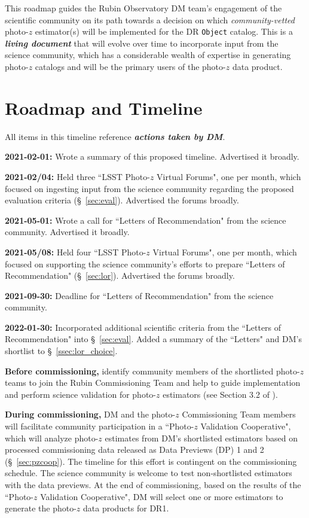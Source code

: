 \documentclass[DM,authoryear,toc]{lsstdoc}
\begin{document}
This roadmap guides the Rubin Observatory DM team's engagement of the scientific community on its path towards a decision on which \textit{community-vetted} photo-$z$ estimator(s) will be implemented for the DR {\tt Object} catalog.
This is a \textit{\textbf{living document}} that will evolve over time to incorporate input from the science community, which has a considerable wealth of expertise in generating photo-$z$ catalogs and will be the primary users of the photo-$z$ data product.


\section{Roadmap and Timeline}\label{sec:time}

All items in this timeline reference \textbf{\textit{actions taken by DM}}.

{\bf 2021-02-01:} Wrote a summary of this proposed timeline. Advertised it broadly.

{\bf 2021-02/04:} Held three ``LSST Photo-$z$ Virtual Forums", one per month, which focused on ingesting input from the science community regarding the proposed evaluation criteria (\S~\ref{sec:eval}). Advertised the forums broadly.

{\bf 2021-05-01:} Wrote a call for ``Letters of Recommendation" from the science community. Advertised it broadly.

{\bf 2021-05/08:} Held four ``LSST Photo-$z$ Virtual Forums", one per month, which focused on supporting the science community's efforts to prepare ``Letters of Recommendation" (\S~\ref{sec:lor}). Advertised the forums broadly.

{\bf 2021-09-30:} Deadline for ``Letters of Recommendation" from the science community.

{\bf 2022-01-30:} Incorporated additional scientific criteria from the ``Letters of Recommendation" into \S~\ref{sec:eval}.
Added a summary of the ``Letters" and DM's shortlist to \S~\ref{ssec:lor_choice}.

{\bf Before commissioning,} identify community members of the shortlisted photo-$z$ teams to join the Rubin Commissioning Team and help to guide implementation and perform science validation for photo-$z$ estimators (see Section 3.2 of \cite{sitcomtn-010}).

{\bf During commissioning,} DM and the photo-$z$ Commissioning Team members will facilitate community participation in a ``Photo-$z$ Validation Cooperative", which will analyze photo-$z$ estimates from DM's shortlisted estimators based on processed commissioning data released as Data Previews (DP) 1 and 2 (\S~\ref{sec:pzcoop}).
The timeline for this effort is contingent on the commissioning schedule.
The science community is welcome to test non-shortlisted estimators with the data previews.
At the end of commissioning, based on the results of the ``Photo-$z$ Validation Cooperative", DM will select one or more estimators to generate the photo-$z$ data products for DR1.
\end{document}
